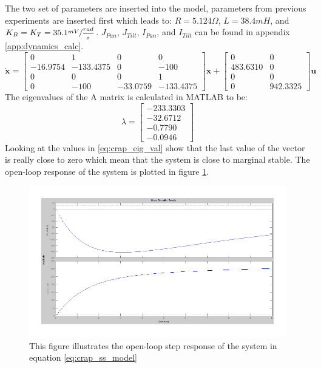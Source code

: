 The two set of parameters are inserted into the model, parameters from previous experiments are inserted first which leads to: $R = 5.124\Omega$, $L = 38.4mH$, and $K_B = K_T = 35.1 \sfrac{mV}{\dfrac{rad}{s}}$. $J_{Pan}$, $J_{Tilt}$, $I_{Pan}$, and $I_{Tilt}$ can be found in appendix \ref{app:dynamics_calc}.
\begin{equation}
 \dot{\textbf{x}} =
 \begin{bmatrix}
   0 & 1 & 0 & 0\\
   - 16.9754 & - 133.4375 & 0 & - 100\\
   0 & 0 & 0 & 1\\
   0 & - 100 & - 33.0759 & - 133.4375
 \end{bmatrix}
 \textbf{x} +
 \begin{bmatrix}
   0 & 0\\
   483.6310 & 0\\
   0 & 0\\
   0 & 942.3325
 \end{bmatrix}
 \textbf{u}\label{eq:crap_ss_model}
\end{equation}
The eigenvalues of the A matrix is calculated in MATLAB to be:
\begin{equation}
 \lambda =
 \begin{bmatrix}
   - 233.3303\\
   - 32.6712\\
   - 0.7790\\
   - 0.0946
 \end{bmatrix}\label{eq:crap_eig_val}
\end{equation}
Looking at the values in \ref{eq:crap_eig_val} show that the last value of the vector is really close to zero which mean that the system is close to marginal stable. The open-loop response of the system is plotted in figure \ref{fig:crap_step}.
\begin{figure}[htb]
	\begin{center}
	\includegraphics[scale=1,trim=0 0 0 0]{graphics/CrapSim.pdf} %
	\caption{This figure illustrates the open-loop step response of the system in equation \ref{eq:crap_ss_model}}
	\label{fig:crap_step}			%
	\end{center}
\end{figure}
